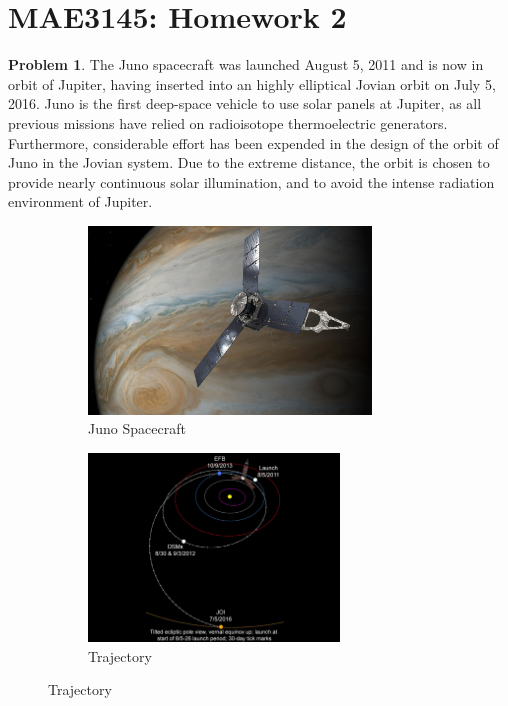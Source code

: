 \documentclass[10pt]{article}
\date{}
\theoremstyle{definition}
\newtheorem{prob}{Problem}[section]
\begin{document}
\pagestyle{empty}
\section*{MAE3145: Homework 2}
\vspace*{-0.4cm}

\begin{prob}
    The Juno spacecraft was launched August 5, 2011 and is now in orbit of Jupiter, having inserted into an highly elliptical Jovian orbit on July 5, 2016.
    Juno is the first deep-space vehicle to use solar panels at Jupiter, as all previous missions have relied on radioisotope thermoelectric generators. 
    Furthermore, considerable effort has been expended in the design of the orbit of Juno in the Jovian system. 
    Due to the extreme distance, the orbit is chosen to provide nearly continuous solar illumination, and to avoid the intense radiation environment of Jupiter.
    \begin{figure}[htbp]
        \centering
        \begin{subfigure}[htbp]{0.5\textwidth} 
            \includegraphics[height=5cm, keepaspectratio]{figures/juno.jpg} 
            \caption{Juno Spacecraft \label{fig:juno}} 
        \end{subfigure}\hfill
        \begin{subfigure}[htbp]{0.5\textwidth} 
            \includegraphics[height=5cm,keepaspectratio]{figures/trajectory.jpg} 
            \caption{Trajectory \label{fig:trajectory<`4`>}} 
        \end{subfigure} 
    \end{figure}
        

\end{prob}
\end{document}
